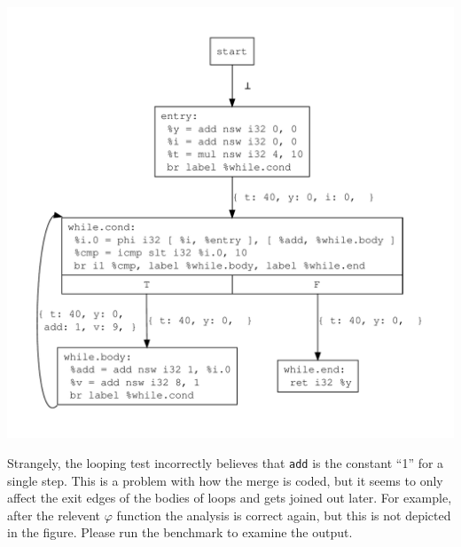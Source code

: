 \documentclass{article}
\theoremstyle{definition}
\begin{document}
\begin{center}
  \includegraphics[scale=.4]{figures/cp/cp_loop/cp_loop.pdf}
\end{center}

Strangely, the looping test incorrectly believes that \texttt{add} is
the constant ``1'' for a single step. This is a problem with how the
merge is coded, but it seems to only affect the exit edges of the
bodies of loops and gets joined out later. For example, after the
relevent $\varphi$ function the analysis is correct again, but this is
not depicted in the figure. Please run the benchmark to examine the
output.
\end{document}
